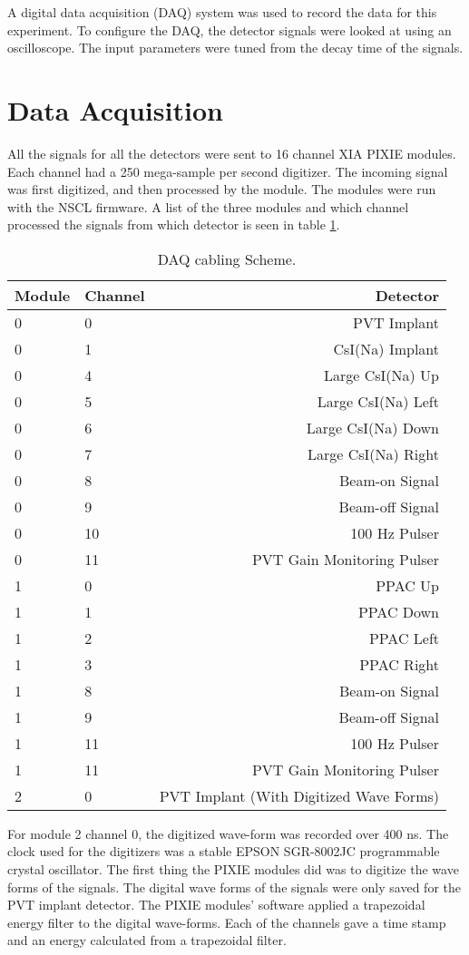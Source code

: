 \documentclass[../MaxHughesThesis.tex]{subfiles}
\begin{document}
A digital data acquisition (DAQ) system was used to record the data for this experiment.
To configure the DAQ, the detector signals were looked at using an oscilloscope.
The input parameters were tuned from the decay time of the signals.

\section{Data Acquisition}

All the signals for all the detectors were sent to 16 channel XIA PIXIE modules. 
Each channel had a 250 mega-sample per second digitizer. 
The incoming signal was first digitized, and then processed by the module. 
The modules were run with the NSCL firmware.
A list of the three modules and which channel processed the signals from which detector is seen in table \ref{tab:cablingscheme}.
%
\begin{table}[!hbt]
	\centering
	\caption{DAQ cabling Scheme.}
		\begin{tabular}{llr}
		Module & Channel & Detector \\ \hline
		0 & 0 & PVT Implant \\
		0 & 1 & CsI(Na) Implant \\
		0 & 4 & Large CsI(Na) Up \\
		0 & 5 & Large CsI(Na) Left \\
		0 & 6 & Large CsI(Na) Down \\
		0 & 7 & Large CsI(Na) Right \\
		0 & 8 & Beam-on Signal \\
		0 & 9 & Beam-off Signal \\
		0 & 10 & 100 Hz Pulser \\
		0 & 11 & PVT Gain Monitoring Pulser \\
		1 & 0 & PPAC Up \\ 
		1 & 1 & PPAC Down \\ 
		1 & 2 & PPAC Left \\ 
		1 & 3 & PPAC Right \\ 
		1 & 8 & Beam-on Signal\\
		1 & 9 & Beam-off Signal\\
		1 & 11 & 100 Hz Pulser \\
		1 & 11 & PVT Gain Monitoring Pulser \\
		2 & 0 & PVT Implant (With Digitized Wave Forms)
		\end{tabular}	
		\label{tab:cablingscheme}
\end{table}
%
For module 2 channel 0, the digitized wave-form was recorded over 400 ns.
The clock used for the digitizers was a stable EPSON SGR-8002JC programmable crystal oscillator.
The first thing the PIXIE modules did was to digitize the wave forms of the signals.
The digital wave forms of the signals were only saved for the PVT implant detector.
The PIXIE modules' software applied a trapezoidal energy filter to the digital wave-forms.
Each of the channels gave a time stamp and an energy calculated from a trapezoidal filter.
\end{document}
